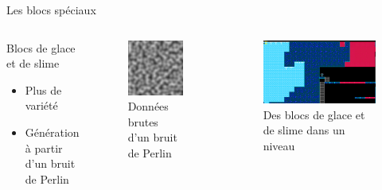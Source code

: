 \documentclass{beamer}
\begin{document}
{\begin{frame}{Les blocs spéciaux}
    \begin{columns}
        \begin{block}{Blocs de glace et de slime}
            \begin{itemize}
                \item[\bullet] Plus de variété
                \item[\bullet] Génération à partir d'un bruit de Perlin
            \end{itemize}
        \end{block}
        \begin{figure}
            \centering
            \includegraphics[height=0.2\textheight]{perlin_noise_example}
            \caption{Données brutes d'un bruit de Perlin}
        \end{figure}
        \begin{figure}
            \centering
            \includegraphics[height=0.2\textheight]{perlin_noise_in_level}
            \caption{Des blocs de glace et de slime dans un niveau}
        \end{figure}
    \end{columns}
\end{frame}

}
\end{document}
